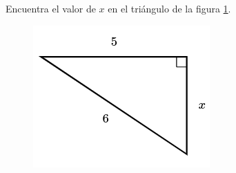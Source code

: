 Encuentra el valor de $x$ en el triángulo de la figura \ref{fig:lados_pitagoras_38}.

\begin{minipage}[t][][t]{0.35\textwidth}
    \begin{figure}[H]
        \centering
        \includegraphics[width=0.9\linewidth]{../images/lados_pitagoras_38.png}

        \caption{}
        \label{fig:lados_pitagoras_38}
    \end{figure}
\end{minipage}\hfill
